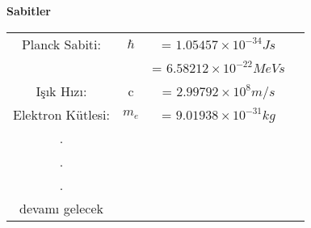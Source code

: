 \textbf{Sabitler}\\

\begin{tabular}{cccc}

Planck Sabiti:&$\hbar$  &=  $1.05457 \times 10^{-34} Js$ \\ 

& &=  $6.58212 \times 10^{-22} MeV s$ \\ 

Işık Hızı:&c  &=  $2.99792 \times 10^{8} m/s$ \\ 

Elektron Kütlesi:&$m_e$  &= $9.01938 \times 10^{-31}kg$\\
.\\
.\\
.\\
devamı gelecek
\end{tabular}
 